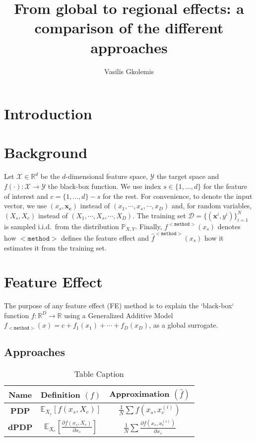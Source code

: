 \documentclass[12pt]{article}
\title{From global to regional effects: a comparison of the different approaches}
\author{Vasilis Gkolemis}
\newcommand{\Rd}{\mathbb{R}^d}
\newcommand{\xb}{\mathbf{x}}
\newcommand{\xc}{\mathbf{x_c}}
\newcommand{\Xcal}{\mathcal{X}}
\newcommand{\Ycal}{\mathcal{Y}}
\begin{document}
\maketitle
\section{Introduction}

\section{Background}

Let \(\Xcal \in \Rd\) be the \(d\)-dimensional feature space, \(\Ycal\) the target space and \(f(\cdot) : \Xcal \rightarrow \Ycal\) the black-box function.  We use index \(s \in \{1, \ldots, d\}\) for the feature of interest and \(c = \{1, \ldots, d\} - s\) for the rest.  For convenience, to denote the input vector, we use \((x_s, \xc)\) instead
of \((x_1, \cdots , x_s, \cdots, x_D)\) and, for random variables,
\((X_s, X_c)\) instead of \((X_1, \cdots , X_s, \cdots, X_D)\).  The
training set \(\mathcal{D} = \{(\xb^i, y^i)\}_{i=1}^N\) is sampled
i.i.d.\ from the distribution \(\mathbb{P}_{X,Y}\).  Finally,
\(f^{\mathtt{<method>}}(x_s)\) denotes how \(\mathtt{<method>}\)
defines the feature effect and \(\hat{f}^{\mathtt{<method>}}(x_s)\)
how it estimates it from the training set.

\section{Feature Effect}

The purpose of any feature effect (FE) method is to explain the
`black-box` function $f: \mathbb{R}^D \rightarrow \mathbb{R}$
using a Generalized Additive Model $f_{\mathtt{<method>}}(x) = c + f_1(x_1) + \cdots + f_D(x_D)$, as a global surrogate.

\subsection{Approaches}

\begin{table}[htbp]
    \centering
    \caption{Table Caption}
    \begin{tabular}{c|c|c}
      \hline
      \textbf{Name} & \textbf{Definition} \((f)\) & \textbf{Approximation} \((\hat{f})\)\\
      \hline
      \textbf{PDP} & $\mathbb{E}_{X_c}[f(x_s,X_c)]$ & $\frac{1}{N} \sum f(x_s,x_c^{(i)})$ \\
      \textbf{dPDP} & $\mathbb{E}_{X_c}[ \frac{\partial f(x_s,X_c)}{\partial x_s}]$ & $\frac{1}{N} \sum \frac{\partial f(x_s,x_c^{(i)})}{\partial x_s}$ \\
    \end{tabular}
\end{table}
\end{document}
